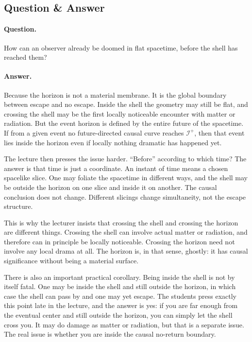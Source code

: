 \subsection{Question \& Answer}

\paragraph{Question.} How can an observer already be doomed in flat spacetime, before the shell has reached them?

\paragraph{Answer.} Because the horizon is not a material membrane. It is the global boundary between escape and no escape. Inside the shell the geometry may still be flat, and crossing the shell may be the first locally noticeable encounter with matter or radiation. But the event horizon is defined by the entire future of the spacetime. If from a given event no future-directed causal curve reaches \(\mathscr I^+\), then that event lies inside the horizon even if locally nothing dramatic has happened yet.

The lecture then presses the issue harder. ``Before'' according to which time? The answer is that time is just a coordinate. An instant of time means a chosen spacelike slice. One may foliate the spacetime in different ways, and the shell may be outside the horizon on one slice and inside it on another. The causal conclusion does not change. Different slicings change simultaneity, not the escape structure.

This is why the lecturer insists that crossing the shell and crossing the horizon are different things. Crossing the shell can involve actual matter or radiation, and therefore can in principle be locally noticeable. Crossing the horizon need not involve any local drama at all. The horizon is, in that sense, ghostly: it has causal significance without being a material surface.

There is also an important practical corollary. Being inside the shell is not by itself fatal. One may be inside the shell and still outside the horizon, in which case the shell can pass by and one may yet escape. The students press exactly this point late in the lecture, and the answer is yes: if you are far enough from the eventual center and still outside the horizon, you can simply let the shell cross you. It may do damage as matter or radiation, but that is a separate issue. The real issue is whether you are inside the causal no-return boundary.

